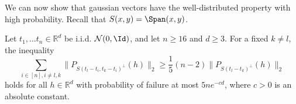 We can now show that gaussian vectors have the well-distributed property with high probability.  Recall that $S(x,y) = \Span(x,y)$.  

\begin{lemma} \label{lem:GT}
Let $t_1,\ldots t_n \in \mathbb{R}^d$ be i.i.d. $\mathcal{N}(0,\Id)$, and let $n\geq 16$ and $d\geq 3$.  For a fixed $k \neq l$, the inequality
\[
\sum_{i \in [n], i \neq l,k} \| P_{S(t_l-t_i, t_k-t_i)^\perp}(h) \|_2 \geq \frac{1}{5}(n-2)\|P_{S(t_l-t_k)^\perp}(h)\|_2
\]
holds for all $h \in \mathbb{R}^d$ with probability of failure at most $5n e^{-cd}$, where $c>0$ is an absolute constant.
\end{lemma}




